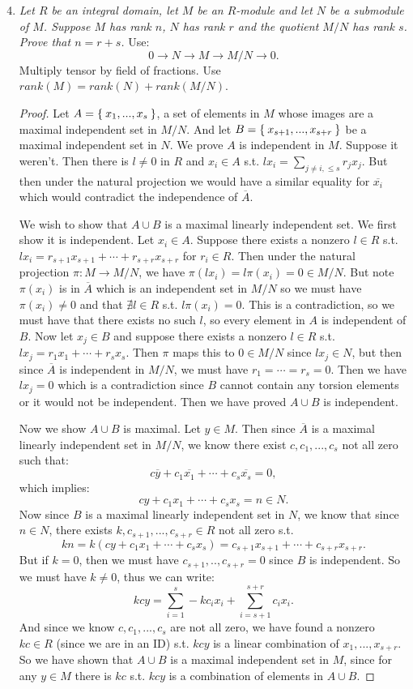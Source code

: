 \documentclass[10pt,oneside,reqno]{amsart}
\theoremstyle{plain}
\theoremstyle{definition}
\theoremstyle{remark}
\renewcommand{\bar}{\overline}%
\begin{document}
\begin{enumerate}[label=\arabic*.]
\setcounter{enumi}{3}
\item \textit{Let $R$ be an integral domain, let $M$ be an $R$-module and let $N$ be a submodule of $M$. Suppose $M$ has rank $n$, $N$ has rank $r$ and the quotient $M/N$ has rank $s$. Prove that $n = r +s$. }
Use:
$$
0 \to N \to M \to M/N \to 0.
$$
Multiply tensor by field of fractions. Use $rank(M) = rank(N) + rank(M/N)$. 

\begin{proof}
Let $A = \Set{x_1,...,x_s}$, a set of elements in $M$ whose images are a maximal independent set in $M/N$. And let $B = \Set{x_{s + 1},...,x_{s + r}}$ be a maximal independent set in $N$. We prove $A$ is independent in $M$. Suppose it weren't. Then there is $l \neq 0$ in $R$ and $x_i \in A$ s.t. $lx_i = \sum_{j \neq i, \leq s} r_jx_j$. But then under the natural projection we would have a similar equality for $\bar{x_i}$ which would contradict the independence of $\bar{A}$. 

We wish to show that $A \cup B$ is a maximal linearly independent set. We first show it is independent. Let $x_i \in A$. Suppose there exists a nonzero $l \in R$ s.t. $lx_i = r_{s + 1}x_{s + 1} + \cdots + r_{s + r}x_{s + r}$ for $r_i \in R$. Then under the natural projection $\pi:M \to M/N$, we have $\pi(lx_i) = l\pi(x_i) = 0 \in M/N$. But note $\pi(x_i)$ is in $\bar{A	}$ which is an independent set in $M/N$ so we must have $\pi(x_i) \neq 0$ and that $\nexists l \in R$ s.t. $l\pi(x_i) = 0$. This is a contradiction, so we must have that there exists no such $l$, so every element in $A$ is independent of $B$. Now let $x_j \in B$ and suppose there exists a nonzero $l \in R$ s.t. $lx_j = r_1x_1 + \cdots + r_sx_s$. Then $\pi$ maps this to $0 \in M/N$ since $lx_j \in N$, but then since $\bar{A}$ is independent in $M/N$, we must have $r_1 = \cdots = r_s = 0$. Then we have $lx_j = 0$ which is a contradiction since $B$ cannot contain any torsion elements or it would not be independent. Then we have proved $A\cup B$ is independent. 



Now we show $A \cup B$ is maximal. Let $y \in M$. Then since $\bar{A}$ is a maximal linearly independent set in $M/N$, we know there exist $c,c_1,...,c_s$ not all zero such that:
$$
c\bar{y} + c_1\bar{x_1} + \cdots + c_s\bar{x_s} = 0,
$$
 which implies:
 $$
 cy + c_1x_1 + \cdots + c_sx_s = n \in N.
 $$
Now since $B$ is a maximal linearly independent set in $N$, we know that since $n \in N$, there exists $k,c_{s + 1},...,c_{s + r} \in R$ not all zero s.t. 
$$
kn = k(cy + c_1x_1 + \cdots + c_sx_s) = c_{s + 1}x_{s + 1} + \cdots + c_{s + r}x_{s + r}.
$$
But if $k = 0$, then we must have $c_{s + 1},..,c_{s + r} = 0$ since $B$ is independent. So we must have $k \neq 0$, thus we can write:
$$
kcy = \sum_{i = 1}^s-kc_ix_i + \sum_{i = s + 1}^{s + r}c_ix_i.
$$
And since we know $c,c_1,...,c_s$ are not all zero, we have found a nonzero $kc \in R$ (since we are in an ID) s.t. $kcy$ is a linear combination of $x_1,...,x_{s + r}$. So we have shown that $A \cup B$ is a maximal independent set in $M$, since for any $y \in M$ there is $kc$ s.t. $kcy$ is a combination of elements in $A \cup B$. 


\end{proof}
\end{enumerate}
\end{document}
